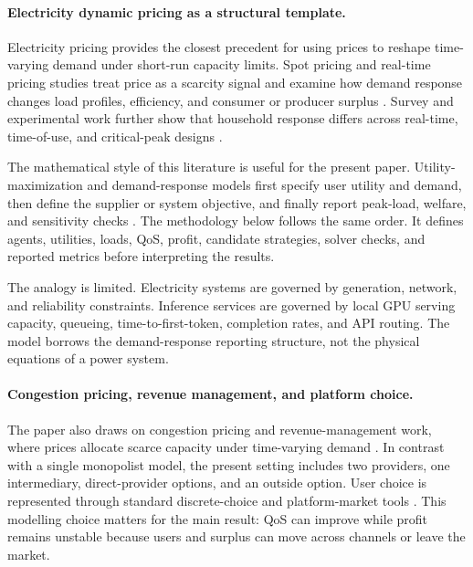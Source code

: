 \documentclass[11pt,a4paper]{article}
\begin{document}
\paragraph{Electricity dynamic pricing as a structural template.}

Electricity pricing provides the closest precedent for using prices to reshape time-varying demand under short-run capacity limits. Spot pricing and real-time pricing studies treat price as a scarcity signal and examine how demand response changes load profiles, efficiency, and consumer or producer surplus \cite{schweppe1988spot,borenstein2005long,allcott2011rethinking}. Survey and experimental work further show that household response differs across real-time, time-of-use, and critical-peak designs \cite{albadi2008summary,faruqui2010household,siano2014demand}.

The mathematical style of this literature is useful for the present paper. Utility-maximization and demand-response models first specify user utility and demand, then define the supplier or system objective, and finally report peak-load, welfare, and sensitivity checks \cite{samadi2010optimal,yang2013game,yu2016supply,srinivasan2017game}. The methodology below follows the same order. It defines agents, utilities, loads, QoS, profit, candidate strategies, solver checks, and reported metrics before interpreting the results.

The analogy is limited. Electricity systems are governed by generation, network, and reliability constraints. Inference services are governed by local GPU serving capacity, queueing, time-to-first-token, completion rates, and API routing. The model borrows the demand-response reporting structure, not the physical equations of a power system.

\paragraph{Congestion pricing, revenue management, and platform choice.}

The paper also draws on congestion pricing and revenue-management work, where prices allocate scarce capacity under time-varying demand \cite{vickrey1969congestion,arnott1990bottleneck,gallego1994dynamic,elmaghraby2003dynamic,bitran2003overview,talluri2004revenue,phillips2005pricing}. In contrast with a single monopolist model, the present setting includes two providers, one intermediary, direct-provider options, and an outside option. User choice is represented through standard discrete-choice and platform-market tools \cite{mcfadden1974conditional,anderson1992discrete,train2009discrete,rochet2003platform}. This modelling choice matters for the main result: QoS can improve while profit remains unstable because users and surplus can move across channels or leave the market.
\end{document}
